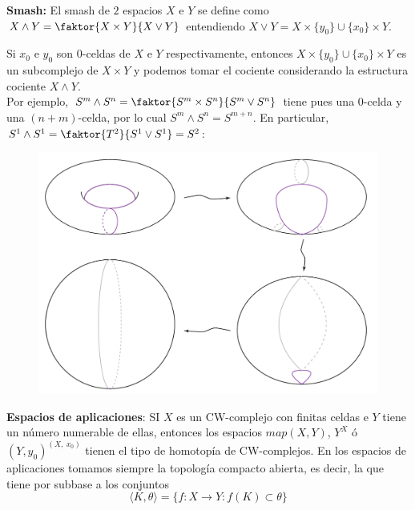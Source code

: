 \textbf{Smash:} El smash de $2$ espacios $X$ e $Y$  se define como $X \wedge Y = \faktor{X \times Y}{X \vee Y}$ entendiendo $X \vee Y = X \times \{y_0\} \cup \{x_0\} \times Y$. \par 
Si $x_0$ e $y_0$ son $0$-celdas de $X$ e $Y$ respectivamente, entonces $X \times \{y_0\} \cup \{x_0\} \times Y$ es un subcomplejo de $X \times Y$ y podemos tomar el cociente considerando la estructura cociente $X \wedge Y$. \\
Por ejemplo, $S^m \wedge S^n = \faktor{S^m \times S^n}{S^m \vee S^n}$ tiene pues una $0$-celda y una $(n+m)$-celda, por lo cual $S^m \wedge S^n = S^{m+n}$. En particular, $S^1 \wedge S^1 = \faktor{T^2}{S^1 \vee S^1} = S^2$: \par 
\begin{figure}[h]
\centering
\includegraphics[width = 0.6\linewidth]{images/smashs2}
\end{figure}

\textbf{Espacios de aplicaciones}: SI $X$ es un CW-complejo con finitas celdas e $Y$ tiene un número numerable de ellas, entonces los espacios
$map(X,Y)$, $Y^X$ ó $(Y, y_0)^{(X, \ x_0)}$ tienen el tipo de homotopía de CW-complejos. En los espacios de aplicaciones tomamos siempre la topología compacto abierta, es decir, la que tiene por subbase a los conjuntos 
\[ \langle K, \theta \rangle = \{f:X \longrightarrow Y : f(K) \subset \theta \} \]


